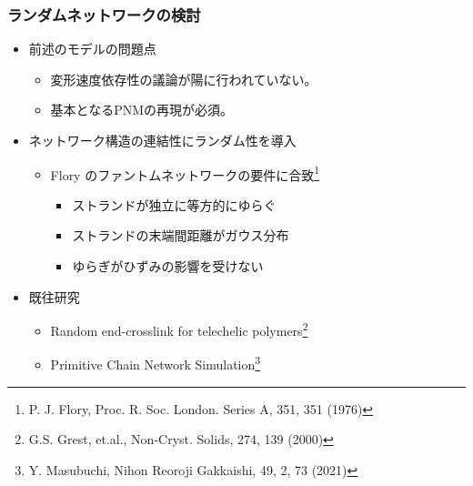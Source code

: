\documentclass[12pt, dvipdfmx]{beamer}
\begin{document}
\begin{frame}
	\frametitle{ランダムネットワークの検討}
			\begin{itemize}
				\item 前述のモデルの問題点
				\begin{itemize}
					\item 変形速度依存性の議論が陽に行われていない。
					\item 基本となるPNMの再現が必須。
				\end{itemize}
				\item ネットワーク構造の\alert{連結性にランダム性}を導入
                    \begin{itemize}
						\item Flory の\alert{ファントムネットワークの要件}に合致\footnote{
							\scriptsize{P. J. Flory, Proc. R. Soc. London. Series A, 351, 351 (1976)}
						}
						\begin{itemize}
							\item ストランドが独立に等方的にゆらぐ
							\item ストランドの末端間距離がガウス分布
							\item ゆらぎがひずみの影響を受けない
						\end{itemize}
					\end{itemize}
				\item 既往研究
				\begin{itemize}
					\item Random end-crosslink for telechelic polymers\footnote{
						\scriptsize{G.S. Grest, et.al., Non-Cryst. Solids, 274, 139 (2000)}
						}
					\item Primitive Chain Network Simulation\footnote{
						\scriptsize{Y. Masubuchi, Nihon Reoroji Gakkaishi, 49, 2, 73 (2021)}
					}
				\end{itemize}
			\end{itemize}
\end{frame}
\end{document}
